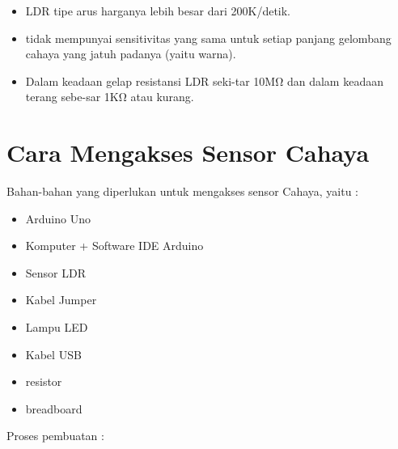 \begin{itemize}
	\item LDR tipe arus harganya lebih besar dari 200K/detik.
	\item tidak mempunyai sensitivitas yang sama untuk setiap panjang gelombang cahaya yang jatuh padanya (yaitu warna).
	\item Dalam keadaan gelap resistansi LDR seki-tar 10MΩ dan dalam keadaan terang sebe-sar 1KΩ atau kurang.
\end{itemize}

\section{Cara Mengakses Sensor Cahaya}

\hspace{4mm} Bahan-bahan yang diperlukan untuk mengakses sensor Cahaya, yaitu :

\begin{itemize}
	\item Arduino Uno 
	\item Komputer + Software IDE Arduino
	\item Sensor LDR
	\item Kabel Jumper
	\item Lampu LED
	\item Kabel USB
	\item resistor
	\item breadboard
\end{itemize}

\break Proses pembuatan :

